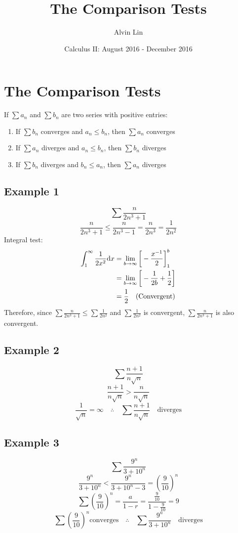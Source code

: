 \documentclass[letterpaper, 12pt]{math}
\title{The Comparison Tests}
\author{Alvin Lin}
\date{Calculus II: August 2016 - December 2016}
\begin{document}
\maketitle

\section*{The Comparison Tests}
If \( \sum{a_{n}} \) and \( \sum{b_{n}} \) are two series with positive entries:
\begin{enumerate}
  \item If \( \sum{b_{n}} \) converges and \( a_{n} \leq b_{n} \), then
    \( \sum{a_{n}} \) converges
  \item If \( \sum{a_{n}} \) diverges and \( a_{n} \leq b_{n} \), then
    \( \sum{b_{n}} \) diverges
  \item If \( \sum{b_{n}} \) diverges and \( b_{n} \leq a_{n} \), then
    \( \sum{a_{n}} \) diverges
\end{enumerate}

\subsection*{Example 1}
\[ \sum\frac{n}{2n^{3}+1} \]
\[ \frac{n}{2n^{3}+1} \leq \frac{n}{2n^{3}-1} = \frac{n}{2n^{3}} =
   \frac{1}{2n^{2}} \]
Integral test:
\begin{align*}
  \int_{1}^{\infty}\frac{1}{2x^{2}}\mathrm{d}{x} &=
    \lim_{b\to\infty}\bigg[-\frac{x^{-1}}{2}\bigg]_{1}^{b} \\
  &= \lim_{b\to\infty}\bigg[-\frac{1}{2b}+\frac{1}{2}\bigg] \\
  &= \frac{1}{2} \quad \mathrm{(Convergent)}
\end{align*}
Therefore, since \( \sum\frac{n}{2n^{3}+1} \leq \sum\frac{1}{2n^{2}} \) and
\( \sum\frac{1}{2n^{2}} \) is convergent, \( \sum\frac{n}{2n^{3}+1} \) is
also convergent.

\subsection*{Example 2}
\[ \sum\frac{n+1}{n\sqrt{n}} \]
\[ \frac{n+1}{n\sqrt{n}} > \frac{n}{n\sqrt{n}} \]
\[ \frac{1}{\sqrt{n}} = \infty \quad \therefore \quad \sum\frac{n+1}{n\sqrt{n}}
   \quad \mathrm{diverges} \]

\subsection*{Example 3}
\[ \sum\frac{9^{n}}{3+10^{n}} \]
\[ \frac{9^{n}}{3+10^{n}} < \frac{9^{n}}{3+10^{n}-3} = (\frac{9}{10})^{n} \]
\[ \sum(\frac{9}{10})^{n} = \frac{a}{1-r} =
   \frac{\frac{9}{10}}{1-\frac{9}{10}} = 9 \]
\[ \sum(\frac{9}{10})^{n} \mathrm{converges} \quad \therefore \quad
   \sum\frac{9^{n}}{3+10^{n}} \quad \mathrm{diverges} \]
\end{document}
